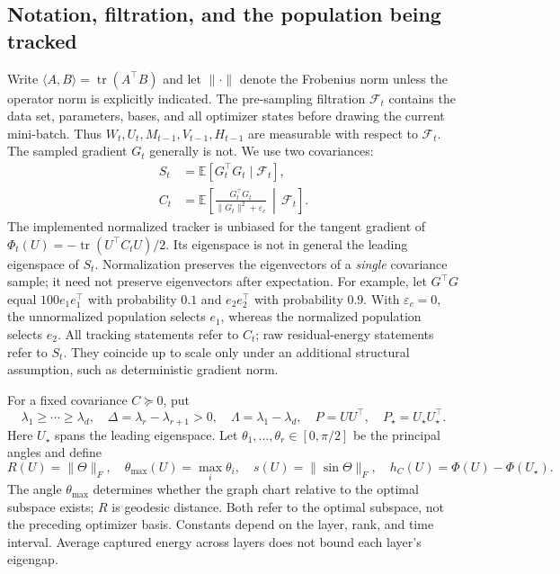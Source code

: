 \subsection{Notation, filtration, and the population being tracked}
\label{app:population}

Write $\langle A,B\rangle=\operatorname{tr}(A^\top B)$ and let $\|\cdot\|$
denote the Frobenius norm unless the operator norm is explicitly indicated.
The pre-sampling filtration $\mathcal F_t$ contains the data set, parameters,
bases, and all optimizer states before drawing the current mini-batch.
Thus $W_t,U_t,M_{t-1},V_{t-1},H_{t-1}$ are measurable with respect to
$\mathcal F_t$. The sampled gradient $G_t$ generally is not. We use two
covariances:
\begin{align}
 S_t&=\mathbb E[G_t^\top G_t\mid\mathcal F_t],\label{eq:raw-cov}\\
 C_t&=\mathbb E\left[\frac{G_t^\top G_t}{\|G_t\|^2+\varepsilon_c}
                 \,\middle|\,\mathcal F_t\right].\label{eq:normalized-cov}
\end{align}
The implemented normalized tracker is unbiased for the tangent gradient of
$\Phi_t(U)=-\operatorname{tr}(U^\top C_tU)/2$. Its eigenspace is not in
general the leading eigenspace of $S_t$. Normalization preserves the eigenvectors
of a \emph{single} covariance sample; it need not preserve eigenvectors after
expectation. For example, let $G^\top G$ equal $100e_1e_1^\top$ with
probability $0.1$ and $e_2e_2^\top$ with probability $0.9$. With
$\varepsilon_c=0$, the unnormalized population selects $e_1$, whereas the
normalized population selects $e_2$. All tracking statements refer to $C_t$;
raw residual-energy statements refer to $S_t$. They coincide up to scale only
under an additional structural assumption, such as deterministic gradient norm.

For a fixed covariance $C\succeq0$, put
\begin{equation}
 \lambda_1\ge\cdots\ge\lambda_d,\quad
 \Delta=\lambda_r-\lambda_{r+1}>0,\quad
 \Lambda=\lambda_1-\lambda_d,\quad
 P=UU^\top,\quad P_\star=U_\star U_\star^\top.
\end{equation}
Here $U_\star$ spans the leading eigenspace. Let
$\theta_1,\ldots,\theta_r\in[0,\pi/2]$ be the principal angles and define
\begin{equation}
 R(U)=\|\Theta\|_F,\quad \theta_{\max}(U)=\max_i\theta_i,
 \quad s(U)=\|\sin\Theta\|_F,\quad h_C(U)=\Phi(U)-\Phi(U_\star).
\end{equation}
The angle $\theta_{\max}$ determines whether the graph chart relative to
the optimal subspace exists; $R$ is geodesic distance. Both refer to the
optimal subspace, not the preceding optimizer basis. Constants depend on
the layer, rank, and time interval. Average captured energy across layers
does not bound each layer's eigengap.

